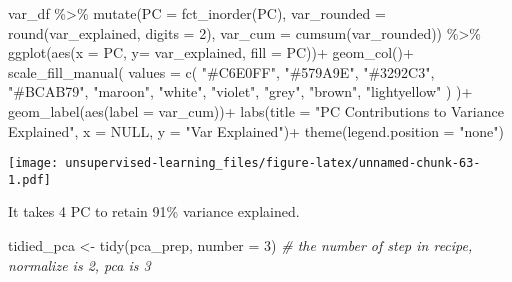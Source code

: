 \documentclass[
]{article}
\newenvironment{Shaded}{\begin{snugshade}}{\end{snugshade}}
\newcommand{\AttributeTok}[1]{\textcolor[rgb]{0.77,0.63,0.00}{#1}}
\newcommand{\CommentTok}[1]{\textcolor[rgb]{0.56,0.35,0.01}{\textit{#1}}}
\newcommand{\ConstantTok}[1]{\textcolor[rgb]{0.00,0.00,0.00}{#1}}
\newcommand{\DecValTok}[1]{\textcolor[rgb]{0.00,0.00,0.81}{#1}}
\newcommand{\FunctionTok}[1]{\textcolor[rgb]{0.00,0.00,0.00}{#1}}
\newcommand{\NormalTok}[1]{#1}
\newcommand{\OtherTok}[1]{\textcolor[rgb]{0.56,0.35,0.01}{#1}}
\newcommand{\SpecialCharTok}[1]{\textcolor[rgb]{0.00,0.00,0.00}{#1}}
\newcommand{\StringTok}[1]{\textcolor[rgb]{0.31,0.60,0.02}{#1}}
\begin{document}
\begin{Shaded}
\begin{Highlighting}[]
\NormalTok{var\_df }\SpecialCharTok{\%\textgreater{}\%}
  \FunctionTok{mutate}\NormalTok{(}\AttributeTok{PC =} \FunctionTok{fct\_inorder}\NormalTok{(PC),}
         \AttributeTok{var\_rounded =} \FunctionTok{round}\NormalTok{(var\_explained, }\AttributeTok{digits =} \DecValTok{2}\NormalTok{),}
         \AttributeTok{var\_cum =} \FunctionTok{cumsum}\NormalTok{(var\_rounded)) }\SpecialCharTok{\%\textgreater{}\%}
  \FunctionTok{ggplot}\NormalTok{(}\FunctionTok{aes}\NormalTok{(}\AttributeTok{x =}\NormalTok{ PC,}
             \AttributeTok{y=}\NormalTok{ var\_explained, }
             \AttributeTok{fill =}\NormalTok{ PC))}\SpecialCharTok{+}
  \FunctionTok{geom\_col}\NormalTok{()}\SpecialCharTok{+} 
  \FunctionTok{scale\_fill\_manual}\NormalTok{(}
    \AttributeTok{values =} \FunctionTok{c}\NormalTok{(}
      \StringTok{"\#C6E0FF"}\NormalTok{,}
      \StringTok{"\#579A9E"}\NormalTok{,}
      \StringTok{"\#3292C3"}\NormalTok{,}
      \StringTok{"\#BCAB79"}\NormalTok{,}
      \StringTok{"maroon"}\NormalTok{,}
      \StringTok{"white"}\NormalTok{,}
      \StringTok{"violet"}\NormalTok{,}
      \StringTok{"grey"}\NormalTok{,}
      \StringTok{"brown"}\NormalTok{,}
      \StringTok{"lightyellow"}
\NormalTok{    )}
\NormalTok{  )}\SpecialCharTok{+}
  \FunctionTok{geom\_label}\NormalTok{(}\FunctionTok{aes}\NormalTok{(}\AttributeTok{label =}\NormalTok{ var\_cum))}\SpecialCharTok{+}
  \FunctionTok{labs}\NormalTok{(}\AttributeTok{title =} \StringTok{"PC Contributions to Variance Explained"}\NormalTok{,}
       \AttributeTok{x =} \ConstantTok{NULL}\NormalTok{,}
       \AttributeTok{y =} \StringTok{"Var Explained"}\NormalTok{)}\SpecialCharTok{+}
  \FunctionTok{theme}\NormalTok{(}\AttributeTok{legend.position =} \StringTok{"none"}\NormalTok{)}
\end{Highlighting}
\end{Shaded}

\texttt{[image: unsupervised-learning\_files/figure-latex/unnamed-chunk-63-1.pdf]}

It takes 4 PC to retain 91\% variance explained.

\begin{Shaded}
\begin{Highlighting}[]
\NormalTok{tidied\_pca }\OtherTok{\textless{}{-}} \FunctionTok{tidy}\NormalTok{(pca\_prep, }
                   \AttributeTok{number =} \DecValTok{3}\NormalTok{) }\CommentTok{\# the number of step in recipe, normalize is 2, pca is 3}
\end{Highlighting}
\end{Shaded}
\end{document}
